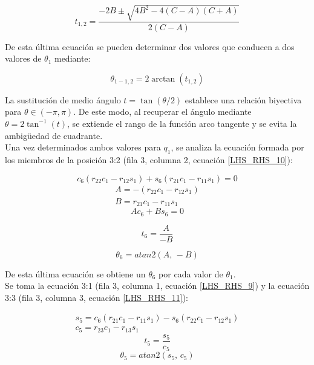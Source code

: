 \documentclass{article}
\begin{document}
\begin{equation}
    t_{1,2}=\frac{-2B\pm\sqrt{4B^2-4(C-A)(C+A)}}{2(C-A)}
\end{equation}

De esta última ecuación se pueden determinar dos valores que conducen a dos valores de $\theta_1$ mediante:

\begin{equation}
    \theta_{1-1,2}=2\arctan(t_{1,2})
\end{equation}

La sustitución de medio ángulo \( t = \tan(\theta/2) \) establece una relación biyectiva para \( \theta \in (-\pi,\pi) \). De este modo, al recuperar el ángulo mediante \( \theta = 2\tan^{-1}(t) \), se extiende el rango de la función arco tangente y se evita la ambigüedad de cuadrante.\\

Una vez determinados ambos valores para $q_1$, se analiza la ecuación formada por los miembros de la posición 3:2 (fila 3, columna 2, ecuación \ref{LHS_RHS_10}):

\begin{equation}
    c_6(r_{22}c_1-r_{12}s_1)+s_6(r_{21}c_1-r_{11}s_1)=0
\end{equation}
\begin{equation}
    \begin{gathered}
        A=-(r_{22}c_1-r_{12}s_1)\\
        B=r_{21}c_1-r_{11}s_1
    \end{gathered}
\end{equation}
\begin{equation}
    Ac_6+Bs_6=0
\end{equation}

\begin{equation}
    t_6 = \frac{A}{-B}
\end{equation}

\begin{equation}
    \theta_{6} = atan2(A,\, -B)
\end{equation}

De esta última ecuación se obtiene un $\theta_6$ por cada valor de $\theta_1$.\\

Se toma la ecuación 3:1 (fila 3, columna 1, ecuación \ref{LHS_RHS_9}) y la ecuación 3:3 (fila 3, columna 3, ecuación \ref{LHS_RHS_11}):

\begin{equation}
    \begin{gathered}
        s_5=c_6(r_{21}c_1-r_{11}s_1)-s_6(r_{22}c_1-r_{12}s_1)\\
        c_5=r_{23}c_1-r_{13}s_1
    \end{gathered}
\end{equation}
\begin{equation}
    t_5 = \frac{s_5}{c_5}
\end{equation}
\begin{equation}
    \theta_5 = atan2(s_5,\, c_5)
\end{equation}
\end{document}
